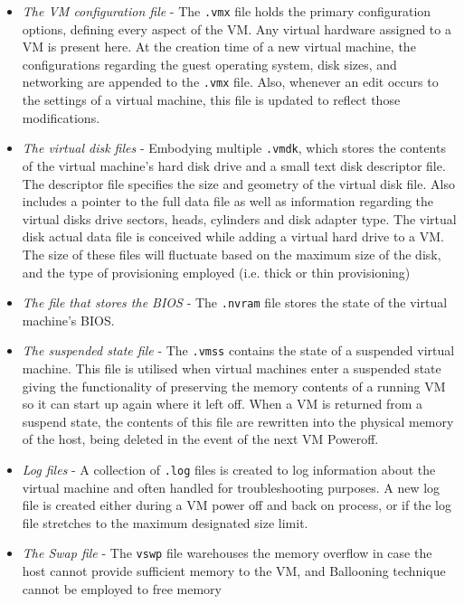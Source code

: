 \begin{itemize}
    \item \emph{The VM configuration file} - The \texttt{.vmx} file holds the primary configuration options, defining every aspect of the VM. Any virtual hardware assigned to a VM is present here. 
		At the creation time of a new virtual machine, the configurations regarding the guest operating system, disk sizes, and networking are appended to the \texttt{.vmx} file. Also, whenever an edit occurs to the settings of a virtual machine, this file is updated to reflect those modifications.
    \item \emph{The virtual disk files} - Embodying multiple \texttt{.vmdk}, which stores the contents of the virtual machine's hard disk drive and a small text disk descriptor file.
		The descriptor file specifies the size and geometry of the virtual disk file. Also includes a pointer to the full data file as well as information regarding the virtual disks drive sectors, heads, cylinders and disk adapter type.
		The virtual disk actual data file is conceived while adding a virtual hard drive to a VM. The size of these files will fluctuate based on the maximum size of the disk, and the type of provisioning employed (i.e. thick or thin provisioning)
    \item \emph{The file that stores the BIOS} - The \texttt{.nvram} file stores the state of the virtual machine's BIOS.
    \item \emph{The suspended state file} - The \texttt{.vmss} contains the state of a suspended virtual machine. This file is utilised when virtual machines enter a suspended state giving the functionality of preserving the memory contents of a running VM so it can start up again where it left off.  When a VM is returned from a suspend state, the contents of this file are rewritten into the physical memory of the host, being deleted in the event of the next VM Poweroff.
    \item \emph{Log files} - A collection of \texttt{.log} files is created to log information about the virtual machine and often handled for troubleshooting purposes. A new log file is created either during a VM power off and back on process, or if the log file stretches to the maximum designated size limit.
	\item \emph{The Swap file} - The \texttt{vswp} file warehouses the memory overflow in case  the host cannot provide sufficient memory to the VM, and Ballooning technique cannot be employed to free memory~\cite{VMWare_esxmem} 
\end{itemize}

